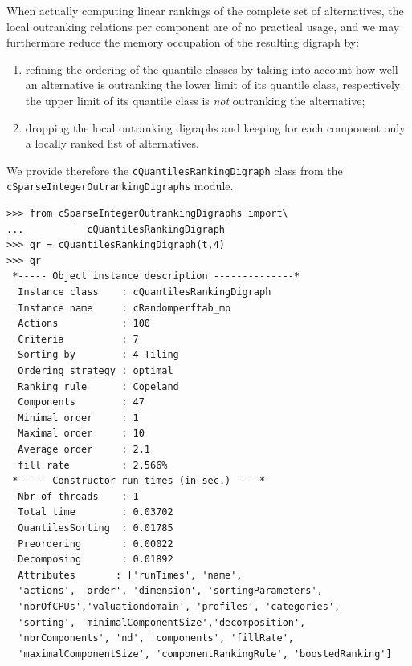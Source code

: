When actually computing linear rankings of the complete set of alternatives, the local outranking relations per component are of no practical usage, and we may furthermore reduce the memory occupation of the resulting digraph by:
\begin{enumerate}[topsep=1pt]
\item refining the ordering of the quantile classes by taking into account how well an alternative is outranking the lower limit of its quantile class, respectively the upper limit of its quantile class is \emph{not} outranking the alternative;
\item dropping the local outranking digraphs and keeping for each component only a locally ranked list of alternatives.
\end{enumerate}

We provide therefore the \texttt{cQuantilesRankingDigraph} class from the \texttt{cSparseIntegerOutrankingDigraphs} module.
\begin{lstlisting}[caption={Ranking the sparse integer outranking digraph},label=list:11.5]
>>> from cSparseIntegerOutrankingDigraphs import\
...           cQuantilesRankingDigraph
>>> qr = cQuantilesRankingDigraph(t,4)
>>> qr
 *----- Object instance description --------------*
  Instance class    : cQuantilesRankingDigraph
  Instance name     : cRandomperftab_mp
  Actions           : 100
  Criteria          : 7
  Sorting by        : 4-Tiling
  Ordering strategy : optimal
  Ranking rule      : Copeland
  Components        : 47
  Minimal order     : 1
  Maximal order     : 10
  Average order     : 2.1
  fill rate         : 2.566%
 *----  Constructor run times (in sec.) ----*
  Nbr of threads    : 1
  Total time        : 0.03702
  QuantilesSorting  : 0.01785
  Preordering       : 0.00022
  Decomposing       : 0.01892
  Attributes       : ['runTimes', 'name',
  'actions', 'order', 'dimension', 'sortingParameters',
  'nbrOfCPUs','valuationdomain', 'profiles', 'categories',
  'sorting', 'minimalComponentSize','decomposition',
  'nbrComponents', 'nd', 'components', 'fillRate',
  'maximalComponentSize', 'componentRankingRule', 'boostedRanking']
\end{lstlisting}

